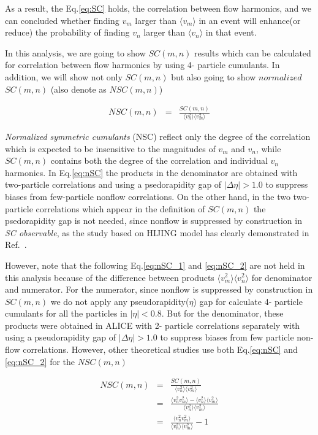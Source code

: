 As a result, the Eq.\ref{eq:SC} holds, the correlation between flow harmonics, and we can concluded whether finding $v_m$ larger than $\langle v_m \rangle$ in an event will enhance(or reduce) the probability of finding $v_n$ larger than $\langle v_n \rangle$ in that event. 

In this analysis, we are going to show $SC(m,n)$ results which can be calculated for correlation between flow harmonics by using 4- particle cumulants. In addition, we will show not only $SC(m,n)$ but also going to show  $normalized$ $SC(m,n)$ (also denote as $NSC(m,n)$)

\begin{eqnarray}
 NSC(m,n) &=& \frac{SC(m,n)}{\langle v_n^2 \rangle \langle v_m^2 \rangle } 	
 \label{eq:nSC}
\end{eqnarray}
\smallskip

\textit{Normalized symmetric cumulants} (NSC)  reflect only the degree of the correlation which is expected to be insensitive to the magnitudes of $v_{m}$ and $v_{n}$, while $SC(m,n)$ contains both the degree of the correlation and individual $v_{n}$ harmonics. In Eq.\ref{eq:nSC} the products in the denominator are obtained with two-particle correlations and using a psedorapidity gap of $|\Delta\eta|>1.0$ to suppress biases from few-particle nonflow correlations. On the other hand, in the two two-particle correlations which appear in the definition of $SC(m,n)$ the psedorapidity gap is not needed, since nonflow is suppressed by construction in \textit{SC observable}, as the study based on HIJING model has clearly demonstrated in Ref.~\cite{ALICE:2016kpq}.

However,  note that the following Eq.\ref{eq:nSC_1} and \ref{eq:nSC_2} are not held in this analysis because of the difference between products $\langle v_m^2 \rangle \langle v_n^2 \rangle$ for denominator and numerator. For the numerator, since nonflow is suppressed by construction in $SC(m,n)$ we do not apply any pseudorapidity($\eta$) gap for calculate 4- particle cumulants for all the particles in $|\eta| < 0.8$. But for the denominator, these products were obtained in ALICE with 2- particle correlations separately with using a pseudorapidity gap of $|\Delta \eta| >  1.0$ to suppress biases from few particle non-flow correlations. However, other theoretical studies \cite{Giacalone:2016afq} use both Eq.\ref{eq:nSC} and \ref{eq:nSC_2} for the  $NSC(m,n)$


\begin{eqnarray}
 NSC(m,n) &=& \frac{SC(m,n)}{\langle v_n^2 \rangle \langle v_m^2 \rangle } \nonumber \\ &=& \frac{ \langle  v_n^2 v_m^2 \rangle  - \langle v_n^2 \rangle \langle v_m^2 \rangle }{\langle v_n^2 \rangle \langle v_m^2 \rangle } \label{eq:nSC_1} \\ &=&   \frac{ \langle  v_n^2 v_m^2 \rangle   }{\langle v_n^2 \rangle \langle v_m^2 \rangle   }   -1	 \label{eq:nSC_2}
\end{eqnarray}


